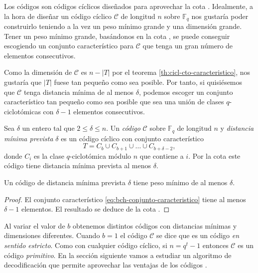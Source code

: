 Los códigos  son códigos cíclicos diseñados para aprovechar la cota .
Idealmente, a la hora de diseñar un código cíclico \(\mathcal C\) de longitud \(n\) sobre \(\mathbb F_q\) nos gustaría poder construirlo teniendo a la vez un peso mínimo grande y una dimensión grande.
Tener un peso mínimo grande, basándonos en la cota , se puede conseguir escogiendo un conjunto característico para \(\mathcal C\) que tenga un gran número de elementos consecutivos.

Como la dimensión de \(\mathcal C\) es \(n - |T|\) por el teorema \ref{th:cicl-cto-caracteristico}, nos gustaría que \(|T|\) fuese tan pequeño como sea posible.
Por tanto, si quisiésemos que \(\mathcal C\) tenga distancia mínima de al menos \(\delta\), podemos escoger un conjunto característico tan pequeño como sea posible que sea una unión de clases \(q\)-ciclotómicas con \(\delta - 1\) elementos consecutivos.

Sea \(\delta\) un entero tal que \(2 \leq \delta \leq n\). Un \textit{código } \(\mathcal C\) sobre \(\mathbb F_q\) de longitud \(n\) y \textit{distancia mínima prevista} \(\delta\) es un código cíclico con conjunto característico
\begin{equation}
  \label{eq:bch-conjunto-caracteristico}
  T = C_b \cup C_{b+1} \cup \dots \cup C_{b + \delta - 2},
\end{equation}
donde \(C_i\) es la clase \(q\)-ciclotómica módulo \(n\) que contiene a \(i\).
Por la cota  este código tiene distancia mínima prevista al menos \(\delta\).

\begin{theorem}
  Un código  de distancia mínima prevista \(\delta\) tiene peso mínimo de al menos \(\delta\).
\end{theorem}

\begin{proof}
  El conjunto característico \ref{eq:bch-conjunto-caracteristico} tiene al menos \(\delta - 1\) elementos.
  El resultado se deduce de la cota .
\end{proof}

Al variar el valor de \(b\) obtenemos distintos códigos con distancias mínimas y dimensiones diferentes.
Cuando \(b = 1\) el código \(\mathcal C\) se dice que es un código  \textit{en sentido estricto}.
Como con cualquier código cíclico, si \(n = q^t - 1\) entonces \(\mathcal C\) es un código  \textit{primitivo}.
En la sección siguiente vamos a estudiar un algoritmo de decodificación que permite aprovechar las ventajas de los códigos .

